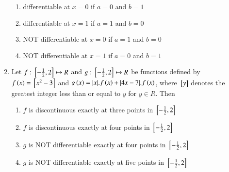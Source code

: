 \documentclass[journal,12pt,twocolumn]{IEEEtran}
\theoremstyle{remark}
\begin{document}
\begin{enumerate}
    \hfill 
    {}
    
    \begin{enumerate}[label=(\alph*)]
        
        \item differentiable at $x=0$ if $a=0$ and $b=1$
        \item differentiable at $x=1$ if $a=1$ and $b=0$
        \item {NOT} differentiable at $x=0$ if $a=1$ and $b=0$
        \item {NOT} differentiable at $x=1$ if $a=0$ and $b=1$
    \end{enumerate}


    \item 
    Let $f:{}\left[-\frac{1}{2}, 2\right]\mapsto R$ and $g:{}\left[-\frac{1}{2}, 2\right]\mapsto R$ be functions defined by $f\left(x\right)={}\left[x^2-3\right]$ and $g\left(x\right)=|x|.f\left(x\right)+|4x-7|.f\left(x\right)$, where ${}\left[y\right]$ denotes the greatest integer less than or equal to $y$ for $y\in R$. Then   
        
    \hfill 
    {}
    
    \begin{enumerate}[label=(\alph*)]
        
        \item $f$ is discontinuous exactly at three points in ${}\left[-\frac{1}{2}, 2\right]$
        \item $f$ is discontinuous exactly at four points in ${}\left[-\frac{1}{2}, 2\right]$
        \item $g$ is NOT differentiable exactly at four points in ${}\left[-\frac{1}{2}, 2\right]$
        \item $g$ is NOT differentiable exactly at five points in ${}\left[-\frac{1}{2}, 2\right]$
    \end{enumerate}

\end{enumerate}
\end{document}
